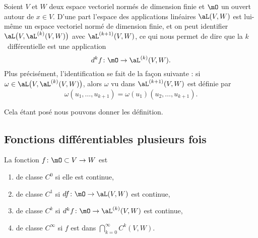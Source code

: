 Soient \( V\) et \( W\) deux espace vectoriel normés de dimension finie et \( \mO\) un ouvert autour de \( x\in V\). D'une part l'espace des applications linéaires \( \aL(V,W)\) est lui-même un espace vectoriel normé de dimension finie, et on peut identifier \(  \aL\big( V,\aL^{(k)}(V,W) \big)\) avec \( \aL^{(k+1)}(V,W)\), ce qui nous permet de dire que la \( k\)\ieme\ différentielle est une application
\begin{equation}
    d^kf\colon \mO\to \aL^{(k)}(V,W).
\end{equation}
Plus précisément, l'identification se fait de la façon suivante : si \( \omega\in \aL\big( V,\aL^{(k)}(V,W) \big)\), alors \( \omega\) vu dans \( \aL^{(k+1)}(V,W)\) est définie par
\begin{equation}
    \omega(u_1,\ldots, u_{k+1})=\omega(u_1)(u_2,\ldots, u_{k+1}).    
\end{equation}


Cela étant posé nous pouvons donner les définition.

\subsection{Fonctions différentiables plusieurs fois}

\begin{definition}
    La fonction \( f\colon \mO\subset V\to W\) est
    \begin{enumerate}
        \item
            de classe \( C^0\) si elle est continue,
        \item
            de classe \( C^1\) si \( df\colon \mO\to \aL(V,W)\) est continue,
        \item
            de classe \( C^k\) si \( d^kf\colon \mO\to \aL^{(k)}(V,W)\) est continue,
        \item
            de classe \(  C^{\infty}\) si \( f\) est dans \( \bigcap_{k=0}^{\infty}C^k(V,W)\).
    \end{enumerate}
\end{definition}

